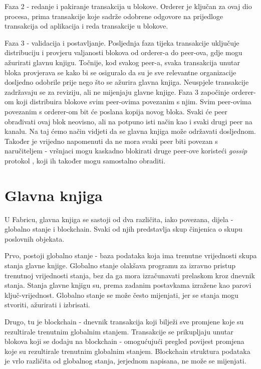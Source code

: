 \documentclass[times, utf8, diplomski]{fer}
\begin{document}
Faza 2 - redanje i pakiranje transakcija u blokove. Orderer je ključan za ovaj dio procesa, prima transakcije koje sadrže odobrene odgovore na prijedloge transakcija od aplikacija i reda transakcije u blokove.

Faza 3 - validacija i postavljanje.  Posljednja faza tijeka transakcije uključuje distribuciju i provjeru valjanosti blokova od orderer-a do peer-ova, gdje mogu ažurirati glavnu knjigu. Točnije, kod svakog peer-a, svaka transakcija unutar bloka provjerava se kako bi se osiguralo da su je sve relevantne organizacije dosljedno odobrile prije nego što se ažurira glavna knjiga.  Neuspjele transakcije zadržavaju se za reviziju, ali ne mijenjaju glavne knjige.  Faza 3 započinje orderer-om koji distribuira blokove svim peer-ovima povezanim s njim.  Svim peer-ovima povezanim s orderer-om bit će poslana kopija novog bloka. Svaki će peer obrađivati ovaj blok neovisno, ali na potpuno isti način kao i svaki drugi peer na kanalu. Na taj ćemo način vidjeti da se glavna knjiga može održavati dosljednom. Također je vrijedno napomenuti da ne mora svaki peer biti povezan s naručiteljem - vršnjaci mogu kaskadno blokirati druge peer-ove koristeći \textit{gossip} protokol \cite{DBLP:journals/corr/abs-2004-07060},  koji ih također mogu samostalno obraditi.

\section{Glavna knjiga}
U Fabricu, glavna knjiga se sastoji od dva različita, iako povezana, dijela - globalno stanje i blockchain. Svaki od njih predstavlja skup činjenica o skupu poslovnih objekata.

Prvo, postoji globalno stanje - baza podataka koja ima trenutne vrijednosti skupa stanja glavne knjige. Globalno stanje olakšava programu za izravno pristup trenutnoj vrijednosti stanja,  bez da ga mora izračunavati prelaskom kroz dnevnik stanja.  Stanja glavne knjigu su, prema zadanim postavkama izražene kao parovi ključ-vrijednost. Globalno stanje se može često mijenjati, jer se stanja mogu stvoriti, ažurirati i izbrisati.

Drugo, tu je blockchain - dnevnik transakcija koji bilježi sve promjene koje su rezultirale trenutnim globalnim stanjem. Transakcije se prikupljaju unutar blokova koji se dodaju na blockchain - omogućujući pregled povijest promjena koje su rezultirale trenutnim globalnim stanjem. Blockchain struktura podataka je vrlo različita od globalnog stanja, jerjednom napisana, ne može se mijenjati.
\end{document}

